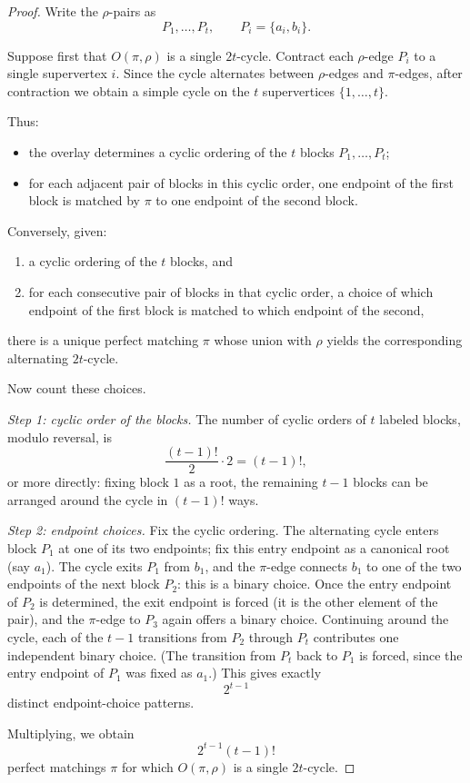 \documentclass[11pt]{article}
\begin{document}
\begin{proof}
Write the $\rho$-pairs as
\[
P_1,\dots,P_t,
\qquad
P_i=\{a_i,b_i\}.
\]

Suppose first that $O(\pi,\rho)$ is a single $2t$-cycle. Contract each $\rho$-edge $P_i$ to a single
supervertex $i$. Since the cycle alternates between $\rho$-edges and $\pi$-edges, after contraction
we obtain a simple cycle on the $t$ supervertices $\{1,\dots,t\}$.

Thus:
\begin{itemize}
    \item the overlay determines a cyclic ordering of the $t$ blocks $P_1,\dots,P_t$;
    \item for each adjacent pair of blocks in this cyclic order, one endpoint of the first block is
    matched by $\pi$ to one endpoint of the second block.
\end{itemize}

Conversely, given:
\begin{enumerate}
    \item a cyclic ordering of the $t$ blocks, and
    \item for each consecutive pair of blocks in that cyclic order, a choice of which endpoint of
    the first block is matched to which endpoint of the second,
\end{enumerate}
there is a unique perfect matching $\pi$ whose union with $\rho$ yields the corresponding alternating
$2t$-cycle.

Now count these choices.

\smallskip
\noindent
\emph{Step 1: cyclic order of the blocks.}
The number of cyclic orders of $t$ labeled blocks, modulo reversal, is
\[
\frac{(t-1)!}{2}\cdot 2 = (t-1)!,
\]
or more directly: fixing block $1$ as a root, the remaining $t-1$ blocks can be arranged around the
cycle in $(t-1)!$ ways.

\smallskip
\noindent
\emph{Step 2: endpoint choices.}
Fix the cyclic ordering. The alternating cycle enters block $P_1$ at one of its two endpoints;
fix this entry endpoint as a canonical root (say $a_1$). The cycle exits $P_1$ from $b_1$, and the
$\pi$-edge connects $b_1$ to one of the two endpoints of the next block $P_2$: this is a binary
choice. Once the entry endpoint of $P_2$ is determined, the exit endpoint is forced (it is the other
element of the pair), and the $\pi$-edge to $P_3$ again offers a binary choice. Continuing around the
cycle, each of the $t-1$ transitions from $P_2$ through $P_t$ contributes one independent binary
choice. (The transition from $P_t$ back to $P_1$ is forced, since the entry endpoint of $P_1$ was
fixed as $a_1$.) This gives exactly
\[
2^{t-1}
\]
distinct endpoint-choice patterns.

Multiplying, we obtain
\[
2^{t-1}(t-1)!
\]
perfect matchings $\pi$ for which $O(\pi,\rho)$ is a single $2t$-cycle.
\end{proof}
\end{document}
